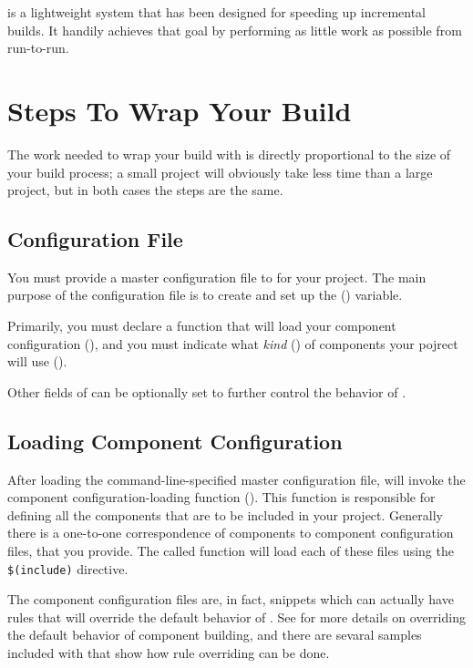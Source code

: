 \lmsbw is a lightweight system that has been designed for speeding up
incremental builds.  It handily achieves that goal by performing as
little work as possible from run-to-run.

\section{Steps To Wrap Your Build}

The work needed to wrap your build with \lmsbw is directly
proportional to the size of your build process; a small project will
obviously take less time than a large project, but in both cases the
steps are the same.

\subsection{Configuration File}

You must provide a master configuration file to \lmsbw for your
project.  The main purpose of the configuration file is to create and
set up the \lmsbwconfiguration ()
variable.

Primarily, you must declare a \gnumake function that will load your
component configuration (), and
you must indicate what \emph{kind} () of
components your pojrect will use
().

Other fields of \lmsbwconfiguration can be optionally set to further
control the behavior of \lmsbw.

\subsection{Loading Component Configuration}

After loading the command-line-specified master configuration file,
\lmsbw will invoke the component configuration-loading function
().  This function is responsible
for defining all the components that are to be included in your
project.  Generally there is a one-to-one correspondence of components
to component configuration files, that you provide.  The called
function will load each of these files using the \gnumake
\texttt{\$(include)} directive.

The component configuration files are, in fact, \makefile snippets
which can actually have rules that will override the default behavior
of \lmsbw.  See  for more details on overriding
the default behavior of component building, and there are sevaral
samples included with \lmsbw that show how rule overriding can be
done.

